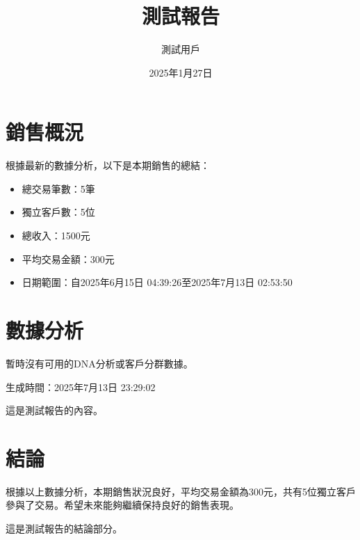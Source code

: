 \documentclass{article}
\title{測試報告}
\author{測試用戶}
\date{2025年1月27日}
\begin{document}
\maketitle

\maketitle

\section{銷售概況}
根據最新的數據分析，以下是本期銷售的總結：

\begin{itemize}
  \item 總交易筆數：5筆
  \item 獨立客戶數：5位
  \item 總收入：1500元
  \item 平均交易金額：300元
  \item 日期範圍：自2025年6月15日 04:39:26至2025年7月13日 02:53:50
\end{itemize}

\section{數據分析}
暫時沒有可用的DNA分析或客戶分群數據。

生成時間：2025年7月13日 23:29:02

這是測試報告的內容。

\section{結論}
根據以上數據分析，本期銷售狀況良好，平均交易金額為300元，共有5位獨立客戶參與了交易。希望未來能夠繼續保持良好的銷售表現。

這是測試報告的結論部分。

\newpage




\end{document}
